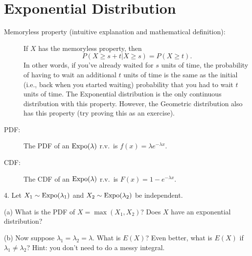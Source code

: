 \documentclass{article}
\begin{document}
\section{Exponential Distribution}
\begin{description}

\item[Memoryless property (intuitive explanation and mathematical definition): ]

If $X$ has the memoryless property, then $$P(X \geq s + t| X \geq s) = P(X \geq t).$$ In other words, if you've already waited for $s$ units of time, the probability of having to wait an additional $t$ units of time is the same as the initial (i.e., back when you started waiting) probability that you had to wait $t$ units of time. The Exponential distribution is the only continuous distribution with this property. However, the Geometric distribution also has this property (try proving this as an exercise).

\item[PDF:] The PDF of an $\textrm{Expo}(\lambda)$ r.v.~is $f(x) = \lambda e^{-\lambda x}$.

\item[CDF:] The CDF of an $\textrm{Expo}(\lambda)$ r.v.~is $F(x) = 1 - e^{-\lambda x}$.

\end{description}

4. Let $X_1 \sim \textrm{Expo}(\lambda_1)$ and $X_2 \sim \textrm{Expo}(\lambda_2)$ be independent. 

(a) What is the PDF of $X = \max(X_1,X_2)$? Does $X$ have an exponential distribution? 


(b) Now suppose $\lambda_1 = \lambda_2 = \lambda$. What is $E(X)$? Even better, what is $E(X)$ if $\lambda_1 \neq \lambda_2$? Hint: you don't need to do a messy integral.
\end{document}
